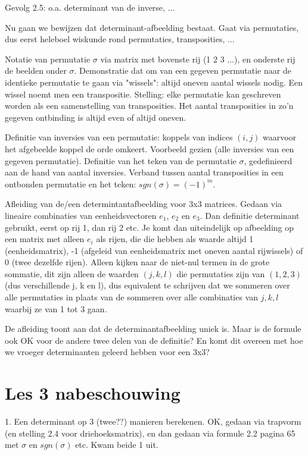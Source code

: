 \documentclass{article}
\begin{document}
Gevolg 2.5: o.a. determinant van de inverse, ... 

Nu gaan we bewijzen dat determinant-afbeelding bestaat. Gaat via permutaties, dus eerst heleboel wiskunde rond permutaties, transposities, ... 

Notatie van permutatie $\sigma$ via matrix met bovenste rij (1 2 3 ...), en onderste rij de beelden onder $\sigma$. Demonstratie dat om van een gegeven  permutatie naar de identieke permutatie te gaan via "wissels": altijd oneven aantal wissels nodig. Een wissel noemt men een transpositie. Stelling: elke permutatie kan geschreven worden als een samenstelling van transposities. Het aantal transposities in zo'n gegeven ontbinding is altijd even of altijd oneven. 

Definitie van inversies van een permutatie: koppels van indices $(i,j)$ waarvoor het afgebeelde koppel de orde omkeert. Voorbeeld gezien (alle inversies van een gegeven permutatie).  Definitie van het teken van de permutatie $\sigma$, gedefinieerd aan de hand van aantal inversies. Verband tussen aantal transposities in een ontbonden permutatie en het teken: $sgn(\sigma)=(-1)^m$. 

Afleiding van de/een determintantafbeelding voor 3x3 matrices. Gedaan via lineaire combinaties van eenheidsvectoren $e_1$, $e_2$ en $e_3$. Dan definitie determinant gebruikt, eerst op rij 1, dan rij 2 etc. Je komt dan uiteindelijk op afbeelding op een matrix met alleen $e_i$ als rijen, die die hebben als waarde altijd 1 (eenheidsmatrix), -1 (afgeleid van eenheidsmatrix met oneven aantal rijwissels) of 0 (twee dezelfde rijen). Alleen kijken naar de niet-nul termen in de grote sommatie, dit zijn alleen de waarden $(j,k,l)$ die permutaties zijn van $(1,2,3)$ (dus verschillende j, k en l), dus equivalent te schrijven dat we sommeren over alle permutaties in plaats van de sommeren over alle combinaties van $j,k,l$ waarbij ze van 1 tot 3 gaan. 

De afleiding toont aan dat de determinantafbeelding uniek is. Maar is de formule ook OK voor de andere twee delen van de definitie?  En komt dit overeen met hoe we vroeger determinanten geleerd hebben voor een 3x3? 


\section{Les 3 nabeschouwing}

1. Een determinant op 3 (twee??) manieren berekenen. OK, gedaan via trapvorm (en stelling 2.4 voor driehoeksmatrix), en dan gedaan via formule 2.2 pagina 65 met $\sigma$ en $sgn(\sigma)$ etc. Kwam beide 1 uit. 
\end{document}
